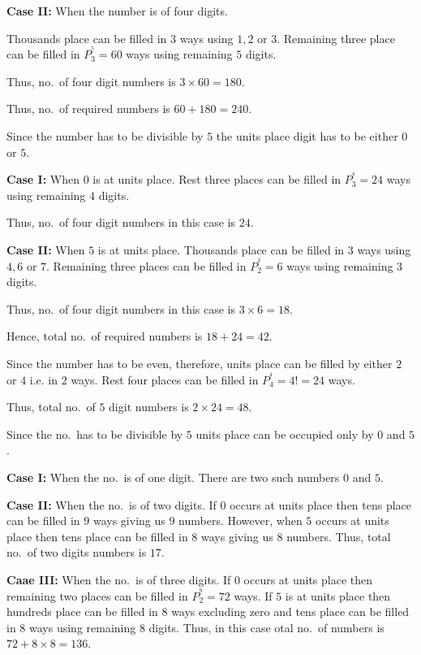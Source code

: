   {\bf Case II:} When the number is of four digits.

  Thousands place can be filled in $3$ ways using $1, 2$ or $3$. Remaining three place can be filled
  in $P_3^^5 = 60$ ways using remaining $5$ digits.

  Thus, no.\ of four digit numbers is $3\times60 = 180$.

  Thus, no.\ of required numbers is $60 + 180 = 240$.
\item Since the number has to be divisible by $5$ the units place digit has to be either $0$ or $5$.

  {\bf Case I:} When $0$ is at units place. Rest three places can be filled in $P_3^^4 = 24$ ways using
  remaining $4$ digits.

  Thus, no.\ of four digit numbers in this case is $24$.

  {\bf Case II:} When $5$ is at units place. Thousands place can be filled in $3$ ways using $4, 6$ or
  $7$. Remaining three places can be filled in $P_2^^3 = 6$ ways using remaining $3$ digits.

  Thus, no.\ of four digit numbers in this case is $3\times6 = 18$.

  Hence, total no.\ of required numbers is $18 + 24 = 42$.
\item Since the number has to be even, therefore, units place can be filled by either $2$ or $4$ i.e. in $2$
  ways. Rest four places can be filled in $P_4^^4 = 4! = 24$ ways.

  Thus, total no.\ of $5$ digit numbers is $2\times24 = 48$.
\item Since the no.\ has to be divisible by $5$ units place can be occupied only by $0$ and $5$.

  {\bf Case I:} When the no.\ is of one digit. There are two such numbers $0$ and $5$.

  {\bf Case II:} When the no.\ is of two digits. If $0$ occurs at units place then tens place can be filled
  in $9$ ways giving us $9$ numbers. However, when $5$ occurs at units place then tens place can be filled
  in $8$ ways giving us $8$ numbers. Thus, total no.\ of two digits numbers is $17$.

  {\bf Caae III:} When the no.\ is of three digits. If $0$ occurs at units place then remaining two places
  can be filled in $P_2^^9 = 72$ ways. If $5$ is at units place then hundreds place can be filled in $8$
  ways excluding zero and tens place can be filled in $8$ ways using remaining $8$ digits. Thus, in this
  case otal no.\ of numbers is $72 + 8\times 8 = 136$.

